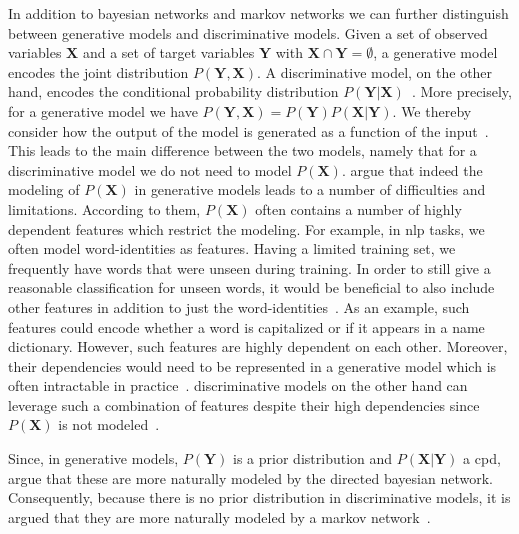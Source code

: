 \bigskip

In addition to \glspl{bayesian network} and \glspl{markov network} we can further distinguish between \glspl{generative model} and \glspl{discriminative model}.
Given a set of \glspl{observed variable} $\mathbf{X}$ and a set of \glspl{target variable} $\mathbf{Y}$ with $\mathbf{X}\cap\mathbf{Y}=\emptyset$, a \gls{generative model} encodes the \gls{joint distribution} $P(\mathbf{Y},\mathbf{X})$.
A \gls{discriminative model}, on the other hand, encodes the \gls{conditional probability distribution} $P(\mathbf{Y}|\mathbf{X})$~\citep{koller2009probabilistic}.
More precisely, for a \gls{generative model} we have $P(\mathbf{Y},\mathbf{X})=P(\mathbf{Y})P(\mathbf{X}|\mathbf{Y})$.
We thereby consider how the output of the model is generated as a function of the input~\citep{sutton2010introduction}.
This leads to the main difference between the two models, namely that for a \gls{discriminative model} we do not need to model $P(\mathbf{X})$.
\citet{sutton2010introduction} argue that indeed the modeling of $P(\mathbf{X})$ in \glspl{generative model} leads to a number of difficulties and limitations.
According to them, $P(\mathbf{X})$ often contains a number of highly dependent features which restrict the modeling.
For example, in \gls{nlp} tasks, we often model word-identities as features.
Having a limited training set, we frequently have words that were unseen during training.
In order to still give a reasonable classification for unseen words, it would be beneficial to also include other features in addition to just the word-identities~\citep{sutton2010introduction}.
As an example, such features could encode whether a word is capitalized or if it appears in a name dictionary.
However, such features are highly dependent on each other.
Moreover, their dependencies would need to be represented in a \gls{generative model} which is often intractable in practice~\citep{sutton2010introduction}.
\Glspl{discriminative model} on the other hand can leverage such a combination of features despite their high dependencies since $P(\mathbf{X})$ is not modeled~\citep{koller2009probabilistic}.

Since, in \glspl{generative model}, $P(\mathbf{Y})$ is a \gls{prior distribution} and $P(\mathbf{X}|\mathbf{Y})$ a \gls{cpd}, \citet{sutton2010introduction} argue that these are more naturally modeled by the directed \gls{bayesian network}.
Consequently, because there is no \gls{prior distribution} in \glspl{discriminative model}, it is argued that they are more naturally modeled by a \gls{markov network}~\citep{sutton2010introduction}.

